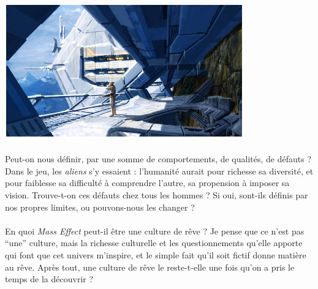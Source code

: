 \begin{center}
	\includegraphics[scale=1.3]{massEffect2.png}
\end{center}
\paragraph{}
Peut-on nous définir, par une somme de comportements, de qualités, de défauts ? Dans le jeu, les  \textit{aliens} s’y essaient : l’humanité aurait pour richesse sa diversité, et pour faiblesse sa difficulté à comprendre l’autre, sa propension à imposer sa vision. Trouve-t-on ces défauts chez tous les hommes ? Si oui, sont-ils définis par nos propres limites, ou pouvons-nous les changer ?
\paragraph{}
En quoi \textit{Mass Effect} peut-il être une culture de rêve ? Je pense que ce n’est pas “une” culture, mais la richesse culturelle et les questionnements qu’elle apporte qui font que cet univers m’inspire, et le simple fait qu’il soit fictif donne matière au rêve. Après tout, une culture de rêve le reste-t-elle une fois qu’on a pris le temps de la découvrir ?